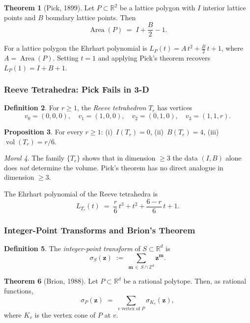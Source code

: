 \documentclass[12pt]{article}
\theoremstyle{definition}
\newtheorem{defn}{Definition}[section]
\newtheorem{thm}[defn]{Theorem}
\newtheorem{prop}[defn]{Proposition}
\theoremstyle{remark}
\newtheorem{moral}[defn]{Moral}
\newcommand{\Z}{\mathbb{Z}}
\newcommand{\R}{\mathbb{R}}
\newcommand{\vol}{\operatorname{vol}}
\begin{document}
\begin{thm}[Pick, 1899]
Let $P \subset \R^2$ be a lattice polygon with $I$ interior lattice
points and $B$ boundary lattice points. Then
\[
  \operatorname{Area}(P) \;=\; I + \frac{B}{2} - 1.
\]
\end{thm}

For a lattice polygon the Ehrhart polynomial is
$L_P(t) = A\,t^2 + \tfrac{B}{2}\,t + 1$,
where $A = \operatorname{Area}(P)$.
Setting $t=1$ and applying Pick's theorem recovers $L_P(1) = I+B+1$.

\subsubsection{Reeve Tetrahedra: Pick Fails in 3-D}

\begin{defn}
For $r \geq 1$, the \emph{Reeve tetrahedron} $T_r$ has vertices
\[
  v_0=(0,0,0),\quad v_1=(1,0,0),\quad v_2=(0,1,0),\quad v_3=(1,1,r).
\]
\end{defn}

\begin{prop}
For every $r \geq 1$:
(i)~$I(T_r)=0$,\quad
(ii)~$B(T_r)=4$,\quad
(iii)~$\vol(T_r)=r/6$.
\end{prop}

\begin{moral}
The family $\{T_r\}$ shows that in dimension $\geq 3$ the data
$(I,B)$ alone does \emph{not} determine the volume. Pick's theorem
has no direct analogue in dimension $\geq 3$.
\end{moral}

The Ehrhart polynomial of the Reeve tetrahedra is
\[
  L_{T_r}(t) \;=\; \frac{r}{6}\,t^3 + t^2 + \frac{6-r}{6}\,t + 1.
\]

\subsubsection{Integer-Point Transforms and Brion's Theorem}

\begin{defn}
The \emph{integer-point transform} of $S \subset \R^d$ is
\[
  \sigma_S(\mathbf{z})
  \;:=\;
  \sum_{\mathbf{m}\,\in\, S\cap\Z^d} \mathbf{z}^{\mathbf{m}}.
\]
\end{defn}

\begin{thm}[Brion, 1988]
Let $P \subset \R^d$ be a rational polytope. Then, as rational
functions,
\[
  \sigma_P(\mathbf{z})
  \;=\;
  \sum_{v\;\text{vertex of }P} \sigma_{K_v}(\mathbf{z}),
\]
where $K_v$ is the vertex cone of $P$ at $v$.
\end{thm}
\end{document}
